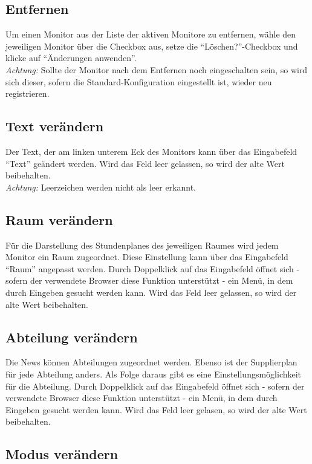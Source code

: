 \subsection{Entfernen}

Um einen Monitor aus der Liste der aktiven Monitore zu entfernen, wähle den jeweiligen Monitor über die Checkbox aus, setze die \enquote{Löschen?}-Checkbox und klicke auf \enquote{Änderungen anwenden}.\\
\textit{Achtung:} Sollte der Monitor nach dem Entfernen noch eingeschalten sein, so wird sich dieser, sofern die Standard-Konfiguration eingestellt ist, wieder neu registrieren.

\subsection{Text verändern}

Der Text, der am linken unterem Eck des Monitors kann über das Eingabefeld \enquote{Text} geändert werden. Wird das Feld leer gelassen, so wird der alte Wert beibehalten.\\
\textit{Achtung:} Leerzeichen werden nicht als leer erkannt.

\subsection{Raum verändern}

Für die Darstellung des Stundenplanes des jeweiligen Raumes wird jedem Monitor ein Raum zugeordnet. Diese Einstellung kann über das Eingabefeld \enquote{Raum} angepasst werden. Durch Doppelklick auf das Eingabefeld öffnet sich - sofern der verwendete Browser diese Funktion unterstützt - ein Menü, in dem durch Eingeben gesucht werden kann. Wird das Feld leer gelassen, so wird der alte Wert beibehalten.

\subsection{Abteilung verändern}

Die News können Abteilungen zugeordnet werden. Ebenso ist der Supplierplan für jede Abteilung anders. Als Folge daraus gibt es eine Einstellungsmöglichkeit für die Abteilung. Durch Doppelklick auf das Eingabefeld öffnet sich - sofern der verwendete Browser diese Funktion unterstützt - ein Menü, in dem durch Eingeben gesucht werden kann. Wird das Feld leer gelasen, so wird der alte Wert beibehalten.

\subsection{Modus verändern}

